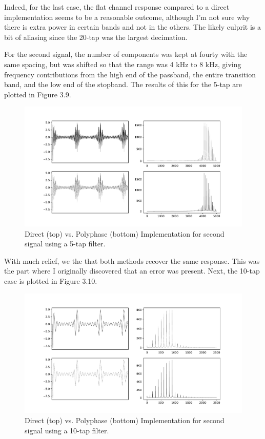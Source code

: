 \documentclass{report}
\begin{document}
Indeed, for the last case, the flat channel response compared to a direct implementation seems to be a reasonable outcome, although I'm not sure why there is extra power in certain bands and not in the others.  The likely culprit is a bit of aliasing since the 20-tap was the largest decimation.

For the second signal, the number of components was kept at fourty with the same spacing, but was shifted so that the range was 4 kHz to 8 kHz, giving frequency contributions from the high end of the passband, the entire transition band, and the low end of the stopband.  The results of this for the 5-tap are plotted in Figure 3.9.

\begin{figure}[!ht]
\includegraphics[scale=.45]{Figure_9.pdf}
\caption{Direct (top) vs. Polyphase (bottom) Implementation for second signal using a 5-tap filter.}
\end{figure} 

With much relief, we the that both methods recover the same response.  This was the part where I originally discovered that an error was present.  Next, the 10-tap case is plotted in Figure 3.10.

\begin{figure}[!ht]
\includegraphics[scale=.45]{Figure_10.pdf}
\caption{Direct (top) vs. Polyphase (bottom) Implementation for second signal using a 10-tap filter.}
\end{figure} 
\end{document}
